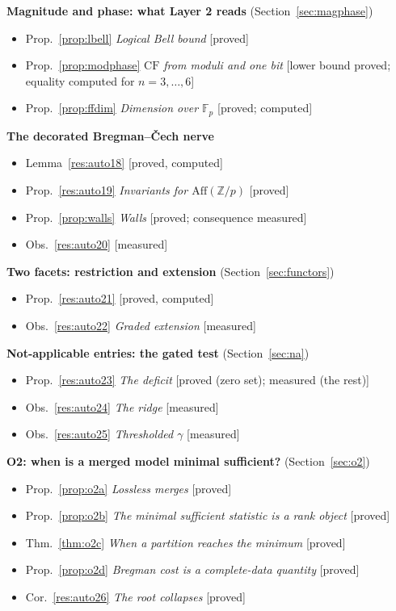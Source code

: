 \documentclass[11pt]{article}
\theoremstyle{definition}
\theoremstyle{remark}
\newcommand{\Z}{\mathbb{Z}}
\newcommand{\F}{\mathbb{F}}
\newcommand{\CF}{\mathrm{CF}}
\newcommand{\Aff}{\mathrm{Aff}}
\begin{document}
\noindent\textbf{Magnitude and phase: what Layer 2 reads} (Section~\ref{sec:magphase})
\begin{itemize}[itemsep=0pt]
  \item Prop.~\ref{prop:lbell} \emph{Logical Bell bound} [proved]
  \item Prop.~\ref{prop:modphase} \emph{$\CF$ from moduli and one bit} [lower bound proved; equality computed for $n=3,\dots,6$]
  \item Prop.~\ref{prop:ffdim} \emph{Dimension over $\F_p$} [proved; computed]
\end{itemize}
\noindent\textbf{The decorated Bregman--\v{C}ech nerve}
\begin{itemize}[itemsep=0pt]
  \item Lemma~\ref{res:auto18} [proved, computed]
  \item Prop.~\ref{res:auto19} \emph{Invariants for $\Aff(\Z/p)$} [proved]
  \item Prop.~\ref{prop:walls} \emph{Walls} [proved; consequence measured]
  \item Obs.~\ref{res:auto20} [measured]
\end{itemize}
\noindent\textbf{Two facets: restriction and extension} (Section~\ref{sec:functors})
\begin{itemize}[itemsep=0pt]
  \item Prop.~\ref{res:auto21} [proved, computed]
  \item Obs.~\ref{res:auto22} \emph{Graded extension} [measured]
\end{itemize}
\noindent\textbf{Not-applicable entries: the gated test} (Section~\ref{sec:na})
\begin{itemize}[itemsep=0pt]
  \item Prop.~\ref{res:auto23} \emph{The deficit} [proved (zero set); measured (the rest)]
  \item Obs.~\ref{res:auto24} \emph{The ridge} [measured]
  \item Obs.~\ref{res:auto25} \emph{Thresholded $\gamma$} [measured]
\end{itemize}
\noindent\textbf{O2: when is a merged model minimal sufficient?} (Section~\ref{sec:o2})
\begin{itemize}[itemsep=0pt]
  \item Prop.~\ref{prop:o2a} \emph{Lossless merges} [proved]
  \item Prop.~\ref{prop:o2b} \emph{The minimal sufficient statistic is a rank object} [proved]
  \item Thm.~\ref{thm:o2c} \emph{When a partition reaches the minimum} [proved]
  \item Prop.~\ref{prop:o2d} \emph{Bregman cost is a complete-data quantity} [proved]
  \item Cor.~\ref{res:auto26} \emph{The root collapses} [proved]
\end{itemize}
\end{document}
